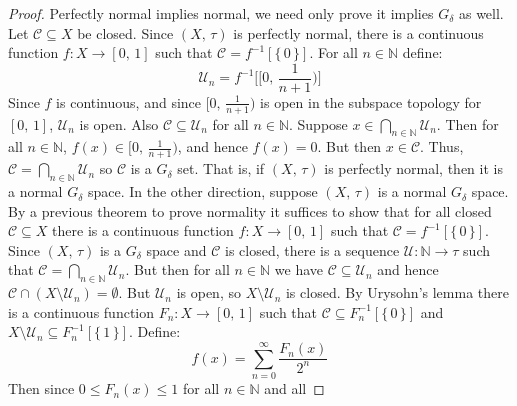 \documentclass{article}
\theoremstyle{plain}
\theoremstyle{normal}
\begin{document}
        \begin{proof}
            Perfectly normal implies normal, we need only prove it implies
            $G_{\delta}$ as well. Let $\mathcal{C}\subseteq{X}$ be closed.
            Since $(X,\,\tau)$ is perfectly normal, there is a continuous
            function $f:X\rightarrow[0,\,1]$ such that
            $\mathcal{C}=f^{-1}[\{\,0\,\}]$. For all $n\in\mathbb{N}$ define:
            \begin{equation}
                \mathcal{U}_{n}=f^{-1}\big[[0,\,\frac{1}{n+1})\big]
            \end{equation}
            Since $f$ is continuous, and since $[0,\,\frac{1}{n+1})$ is open in
            the subspace topology for $[0,\,1]$, $\mathcal{U}_{n}$ is open.
            Also $\mathcal{C}\subseteq\mathcal{U}_{n}$ for all $n\in\mathbb{N}$.
            Suppose $x\in\bigcap_{n\in\mathbb{N}}\mathcal{U}_{n}$.
            Then for all $n\in\mathbb{N}$, $f(x)\in[0,\,\frac{1}{n+1})$, and
            hence $f(x)=0$. But then $x\in\mathcal{C}$. Thus,
            $\mathcal{C}=\bigcap_{n\in\mathbb{N}}\mathcal{U}_{n}$ so
            $\mathcal{C}$ is a $G_{\delta}$ set. That is, if $(X,\,\tau)$ is
            perfectly normal, then it is a normal $G_{\delta}$ space. In the
            other direction, suppose $(X,\,\tau)$ is a normal $G_{\delta}$
            space. By a previous theorem to prove normality it suffices to
            show that for all closed $\mathcal{C}\subseteq{X}$ there is a
            continuous function $f:X\rightarrow[0,\,1]$ such that
            $\mathcal{C}=f^{-1}[\{\,0\,\}]$. Since $(X,\,\tau)$ is a
            $G_{\delta}$ space and $\mathcal{C}$ is closed, there is a sequence
            $\mathcal{U}:\mathbb{N}\rightarrow\tau$ such that
            $\mathcal{C}=\bigcap_{n\in\mathbb{N}}\mathcal{U}_{n}$. But then
            for all $n\in\mathbb{N}$ we have
            $\mathcal{C}\subseteq\mathcal{U}_{n}$ and hence
            $\mathcal{C}\cap(X\setminus\mathcal{U}_{n})=\emptyset$. But
            $\mathcal{U}_{n}$ is open, so $X\setminus\mathcal{U}_{n}$ is closed.
            By Urysohn's lemma there is a continuous function
            $F_{n}:X\rightarrow[0,\,1]$ such that
            $\mathcal{C}\subseteq{F}_{n}^{-1}[\{\,0\,\}]$ and
            $X\setminus\mathcal{U}_{n}\subseteq{F}_{n}^{-1}[\{\,1\,\}]$. Define:
            \begin{equation}
                f(x)=\sum_{n=0}^{\infty}\frac{F_{n}(x)}{2^{n}}
            \end{equation}
            Then since $0\leq{F}_{n}(x)\leq{1}$ for all $n\in\mathbb{N}$ and all

\end{proof}
\end{document}
